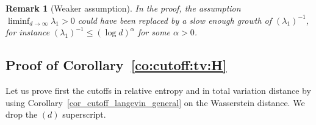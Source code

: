 \documentclass[10pt,reqno]{amsart}
\newtheorem{remark}[theorem]{Remark}
\numberwithin{equation}{section}
\begin{document}
\begin{remark}[Weaker assumption]
  In the proof, the assumption $\liminf_{d\to\infty}\lambda_1 > 0$ could have
  been replaced by a slow enough growth of $(\lambda_1)^{-1}$, for instance
  $(\lambda_1)^{-1} \leq (\log d)^\alpha$ for some $\alpha > 0$.
\end{remark}

\subsection{Proof of Corollary~\ref{co:cutoff:tv:H}}

Let us prove first the cutoffs in relative entropy and in total variation
distance by using Corollary~\ref{cor_cutoff_langevin_general} on the
Wasserstein distance. We drop the $(d)$ superscript.
\end{document}
